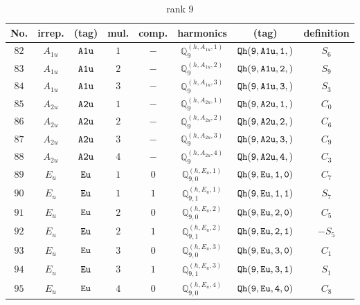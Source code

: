 \documentclass[fleqn,8pt]{jsarticle}
\begin{document}
\begin{table}[ht!]
\begin{center}
\caption{rank 9}
\renewcommand{\arraystretch}{1.3}
\begin{tabular}{cccccccc} \hline \hline
No. & irrep. & (tag) & mul. & comp. & harmonics & (tag) & definition \\ \hline
$ 82 $ & $ A_{1u} $ & $ {\tt A1u} $ & $ 1 $ & $ - $ & $ \mathbb{Q}_{9}^{(h,A_{1u},1)} $ & $ {\tt Qh(9,A1u,1,)} $ & $ S_{6} $ \\
$ 83 $ & $ A_{1u} $ & $ {\tt A1u} $ & $ 2 $ & $ - $ & $ \mathbb{Q}_{9}^{(h,A_{1u},2)} $ & $ {\tt Qh(9,A1u,2,)} $ & $ S_{9} $ \\
$ 84 $ & $ A_{1u} $ & $ {\tt A1u} $ & $ 3 $ & $ - $ & $ \mathbb{Q}_{9}^{(h,A_{1u},3)} $ & $ {\tt Qh(9,A1u,3,)} $ & $ S_{3} $ \\
$ 85 $ & $ A_{2u} $ & $ {\tt A2u} $ & $ 1 $ & $ - $ & $ \mathbb{Q}_{9}^{(h,A_{2u},1)} $ & $ {\tt Qh(9,A2u,1,)} $ & $ C_{0} $ \\
$ 86 $ & $ A_{2u} $ & $ {\tt A2u} $ & $ 2 $ & $ - $ & $ \mathbb{Q}_{9}^{(h,A_{2u},2)} $ & $ {\tt Qh(9,A2u,2,)} $ & $ C_{6} $ \\
$ 87 $ & $ A_{2u} $ & $ {\tt A2u} $ & $ 3 $ & $ - $ & $ \mathbb{Q}_{9}^{(h,A_{2u},3)} $ & $ {\tt Qh(9,A2u,3,)} $ & $ C_{9} $ \\
$ 88 $ & $ A_{2u} $ & $ {\tt A2u} $ & $ 4 $ & $ - $ & $ \mathbb{Q}_{9}^{(h,A_{2u},4)} $ & $ {\tt Qh(9,A2u,4,)} $ & $ C_{3} $ \\
$ 89 $ & $ E_{u} $ & $ {\tt Eu} $ & $ 1 $ & $ 0 $ & $ \mathbb{Q}_{9,0}^{(h,E_{u},1)} $ & $ {\tt Qh(9,Eu,1,0)} $ & $ C_{7} $ \\
$ 90 $ & $ E_{u} $ & $ {\tt Eu} $ & $ 1 $ & $ 1 $ & $ \mathbb{Q}_{9,1}^{(h,E_{u},1)} $ & $ {\tt Qh(9,Eu,1,1)} $ & $ S_{7} $ \\
$ 91 $ & $ E_{u} $ & $ {\tt Eu} $ & $ 2 $ & $ 0 $ & $ \mathbb{Q}_{9,0}^{(h,E_{u},2)} $ & $ {\tt Qh(9,Eu,2,0)} $ & $ C_{5} $ \\
$ 92 $ & $ E_{u} $ & $ {\tt Eu} $ & $ 2 $ & $ 1 $ & $ \mathbb{Q}_{9,1}^{(h,E_{u},2)} $ & $ {\tt Qh(9,Eu,2,1)} $ & $ - S_{5} $ \\
$ 93 $ & $ E_{u} $ & $ {\tt Eu} $ & $ 3 $ & $ 0 $ & $ \mathbb{Q}_{9,0}^{(h,E_{u},3)} $ & $ {\tt Qh(9,Eu,3,0)} $ & $ C_{1} $ \\
$ 94 $ & $ E_{u} $ & $ {\tt Eu} $ & $ 3 $ & $ 1 $ & $ \mathbb{Q}_{9,1}^{(h,E_{u},3)} $ & $ {\tt Qh(9,Eu,3,1)} $ & $ S_{1} $ \\
$ 95 $ & $ E_{u} $ & $ {\tt Eu} $ & $ 4 $ & $ 0 $ & $ \mathbb{Q}_{9,0}^{(h,E_{u},4)} $ & $ {\tt Qh(9,Eu,4,0)} $ & $ C_{8} $ \\

\end{tabular}
\end{center}
\end{table}
\end{document}
